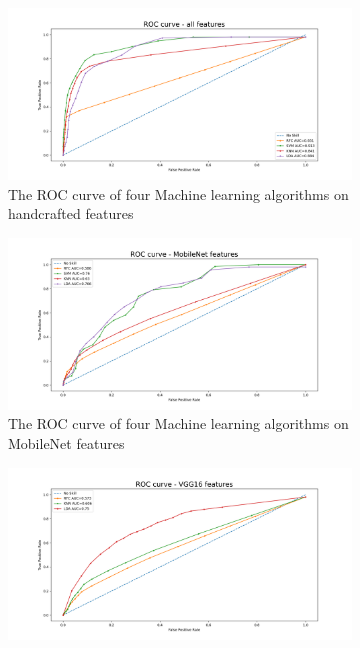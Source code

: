 \begin{figure}
     \centering
     \begin{subfigure}[b]{0.45\textwidth}
         \centering
         \includegraphics[width=1\textwidth]{manuscript/src/figures/project/roc_curve_all 2021-04-09-11:12:24-tree-Mobnet-standardization.png}
         \caption{The ROC curve of four Machine learning algorithms on handcrafted features}
         \label{fig:ROC_all}
     \end{subfigure}
     \hfill
     \begin{subfigure}[b]{0.45\textwidth}
         \centering
         \includegraphics[width=\textwidth]{manuscript/src/figures/project/roc_curve_MobileNet 2021-04-09-11:12:24-tree-Mobnet-standardization.png}
         \caption{The ROC curve of four Machine learning algorithms on MobileNet features}
         \label{fig:ROC_Mob}
     \end{subfigure}
     \vfill
     \begin{subfigure}[b]{0.45\textwidth}
         \centering
         \includegraphics[width=\textwidth]{manuscript/src/figures/project/roc_curve_vgg 2021-04-09-11:12:24-tree-Mobnet-standardization.png}

\end{subfigure}
\end{figure}
